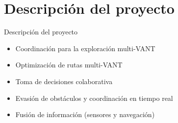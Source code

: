 \documentclass[
  24pt, %
  aspectratio=169, %
]{beamer}
\begin{document}
\section{Descripción del proyecto}
\begin{frame}{Descripción del proyecto}
  \begin{minipage}{0.47\textwidth}
    \begin{itemize}
    \item<1-> Coordinación para la exploración multi-VANT 
    \item<2-> Optimización de rutas multi-VANT %
    \item<3-> Toma de decisiones colaborativa
    \item<4-> Evasión de obstáculos y coordinación en tiempo real
    \item<5-> Fusión de información (sensores y navegación)
    \end{itemize}
  \end{minipage}
  \begin{minipage}{0.5\textwidth}
\end{minipage}
\end{frame}
\end{document}
